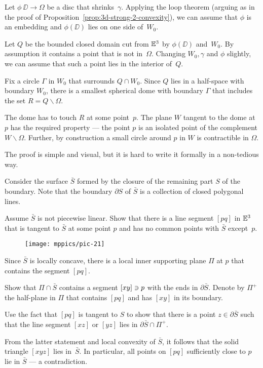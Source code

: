 Let $\phi\:\DD\to \Omega$ be a disc that  shrinks~$\gamma$.
Applying the loop theorem (arguing as in the proof of Proposition~\ref{prop:3d-strong-2-convexity}), we can assume that $\phi$ is an embedding and $\phi(\DD)$ lies on one side of~$W_0$.

Let $Q$ be the bounded closed domain cut from $\mathbb{E}^3$ by $\phi(\DD)$ and~$W_0$. 
By assumption it contains a point that is not in~$\Omega$. 
Changing $W_0,\gamma$ and $\phi$ slightly, we can assume that such a point lies in the interior of~$Q$.

Fix a circle $\Gamma$ in $W_0$ that  surrounds $Q\cap W_0$.
Since $Q$ lies in a half-space with boundary $W_0$, there is a
smallest spherical dome with boundary $\Gamma$ that  includes the set $R=Q\backslash\Omega$.

The dome has to touch $R$ at some point~$p$.
The plane $W$ tangent to the dome at $p$ has the required property --- the point $p$ is an isolated point of the complement $W\backslash \Omega$.
Further, by construction a small circle around $p$ in $W$ is contractible in $\Omega$.

The proof is simple and visual, but it is hard to write it formally in a non-tedious way.

\medskip

Consider the surface $\bar S$ 
formed by the closure of the remaining part $S$ of the boundary.
Note that the boundary $\partial S$ of $\bar S$ is a collection of closed polygonal lines.

Assume $\bar S$ is not piecewise linear.
Show that there is a line segment $[pq]$ in $\mathbb{E}^3$ that is tangent to $\bar S$ at some point $p$ and    has no common points with $\bar S$ except~$p$.


\begin{wrapfigure}{r}{35 mm}
\vskip-4mm
\centering
\texttt{[image: mppics/pic-21]}
\end{wrapfigure}

Since $\bar S$ is locally concave,
there is a local inner supporting plane $\Pi$ at $p$ that contains the segment $[pq]$.

Show that $\Pi\cap \bar S$ contains a segment $[xy]\z\ni p$ with the ends in $\partial \bar S$.
Denote by $\Pi^+$ the half-plane in $\Pi$ that contains $[pq]$ and has $[xy]$ in its boundary.

Use the fact that $[pq]$ is tangent to $S$ to show that there is a point $z\in\partial \bar S$ such that the line segment $[xz]$ or $[yz]$ lies in $\partial \bar S\cap\Pi^+$.
 

From the latter statement and local convexity of $\bar S$, 
it follows that the solid triangle $[xyz]$ lies in~$\bar S$.
In particular, all points on $[pq]$ sufficiently close to $p$ lie in $\bar S$ --- a contradiction.


